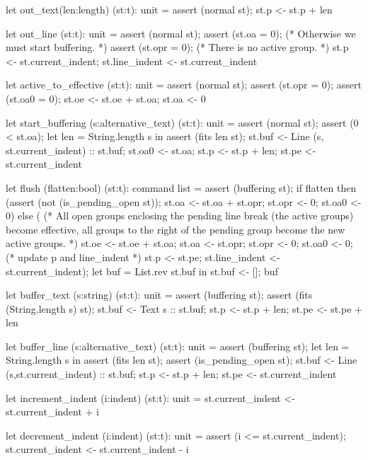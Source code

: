\documentclass[12pt]{article}
\begin{document}
\begin{ocaml}
    let out_text(len:length) (st:t): unit =
      assert (normal st);
      st.p <- st.p + len

    let out_line (st:t): unit =
      assert (normal st);
      assert (st.oa = 0);  (* Otherwise we must start buffering. *)
      assert (st.opr = 0); (* There is no active group. *)
      st.p <- st.current_indent;
      st.line_indent <- st.current_indent

    let active_to_effective (st:t): unit =
      assert (normal st);
      assert (st.opr = 0);
      assert (st.oa0 = 0);
      st.oe <- st.oe + st.oa;
      st.oa <- 0

    let start_buffering (s:alternative_text) (st:t): unit =
      assert (normal st);
      assert (0 < st.oa);
      let len = String.length s in
      assert (fits len st);
      st.buf <- Line (s, st.current_indent) :: st.buf;
      st.oa0 <- st.oa;
      st.p <- st.p + len;
      st.pe <- st.current_indent

    let flush (flatten:bool) (st:t): command list =
      assert (buffering st);
      if flatten then
        (assert (not (is_pending_open st));
         st.oa <- st.oa + st.opr;
         st.opr <- 0;
         st.oa0 <- 0)
      else
        ( (* All open groups enclosing the pending line break (the active
             groups) become effective, all groups to the right of the pending
             group become the new active groups. *)
          st.oe <- st.oe + st.oa;
          st.oa <- st.opr;
          st.opr <- 0;
          st.oa0 <- 0;
          (* update p and line_indent *)
          st.p   <- st.pe;
          st.line_indent <- st.current_indent);
      let buf = List.rev st.buf in
      st.buf <- [];
      buf

    let buffer_text (s:string) (st:t): unit =
      assert (buffering st);
      assert (fits (String.length s) st);
      st.buf <- Text s :: st.buf;
      st.p <- st.p + len;
      st.pe <- st.pe + len

    let buffer_line (s:alternative_text) (st:t): unit =
      assert (buffering st);
      let len = String.length s in
      assert (fits len st);
      assert (is_pending_open st);
      st.buf <- Line (s,st.current_indent) :: st.buf;
      st.p   <- st.p + len;
      st.pe  <- st.current_indent

    let increment_indent (i:indent) (st:t): unit =
      st.current_indent <- st.current_indent + i

    let decrement_indent (i:indent) (st:t): unit =
      assert (i <= st.current_indent);
      st.current_indent <- st.current_indent - i


\end{ocaml}
\end{document}
